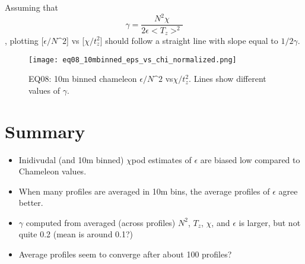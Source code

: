 \documentclass[11pt]{article}
\begin{document}
Assuming that
\begin{equation}
\gamma=\frac{N^2 \chi}{2\epsilon<T_z>^2}
\end{equation}
, plotting [$\epsilon/N\^2$] vs [$\chi/t_{z}^{2}$] should follow a straight line with slope equal to $1/2\gamma$.

\begin{figure}[htbp]
\texttt{[image: eq08\_10mbinned\_eps\_vs\_chi\_normalized.png]}
\caption{EQ08: 10m binned  chameleon $\epsilon/N\^2$ vs$\chi/t_{z}^{2}$. Lines show different values of $\gamma$.}
\label{}
\end{figure}





\clearpage
\section{Summary}

\begin{itemize}
\item Inidivudal (and 10m binned) $\chi$pod estimates of $\epsilon$ are biased low compared to Chameleon values.
\item When many profiles are averaged in 10m bins, the average profiles of $\epsilon$ agree better.
\item $\gamma$ computed from averaged (across profiles) $N^2$, $T_z$, $\chi$, and $\epsilon$ is larger, but not quite 0.2 (mean is around 0.1?)
\item Average profiles seem to converge after about 100 profiles?
\end{itemize}
\end{document}
